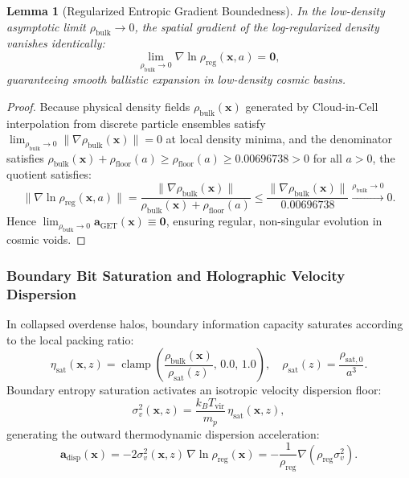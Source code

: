 \documentclass[11pt]{article}
\theoremstyle{plain}
\newtheorem{lemma}{Lemma}
\begin{document}
\begin{lemma}[Regularized Entropic Gradient Boundedness]
In the low-density asymptotic limit $\rho_{\mathrm{bulk}} \to 0$, the spatial gradient of the log-regularized density vanishes identically:
\begin{equation}
\lim_{\rho_{\mathrm{bulk}} \to 0} \nabla \ln \rho_{\mathrm{reg}}(\mathbf{x}, a) = \mathbf{0},
\end{equation}
guaranteeing smooth ballistic expansion in low-density cosmic basins.
\end{lemma}

\begin{proof}
Because physical density fields $\rho_{\mathrm{bulk}}(\mathbf{x})$ generated by Cloud-in-Cell interpolation from discrete particle ensembles satisfy $\lim_{\rho_{\mathrm{bulk}} \to 0} \|\nabla \rho_{\mathrm{bulk}}(\mathbf{x})\| = 0$ at local density minima, and the denominator satisfies $\rho_{\mathrm{bulk}}(\mathbf{x}) + \rho_{\mathrm{floor}}(a) \ge \rho_{\mathrm{floor}}(a) \ge 0.00696738 > 0$ for all $a > 0$, the quotient satisfies:
\begin{equation}
\|\nabla \ln \rho_{\mathrm{reg}}(\mathbf{x}, a)\| = \frac{\|\nabla \rho_{\mathrm{bulk}}(\mathbf{x})\|}{\rho_{\mathrm{bulk}}(\mathbf{x}) + \rho_{\mathrm{floor}}(a)} \le \frac{\|\nabla \rho_{\mathrm{bulk}}(\mathbf{x})\|}{0.00696738} \xrightarrow{\rho_{\mathrm{bulk}} \to 0} 0.
\end{equation}
Hence $\lim_{\rho_{\mathrm{bulk}} \to 0} \mathbf{a}_{\mathrm{GET}}(\mathbf{x}) \equiv \mathbf{0}$, ensuring regular, non-singular evolution in cosmic voids.
\end{proof}

\subsubsection{Boundary Bit Saturation and Holographic Velocity Dispersion}
In collapsed overdense halos, boundary information capacity saturates according to the local packing ratio:
\begin{equation}
\eta_{\mathrm{sat}}(\mathbf{x}, z) = \operatorname{clamp}\left( \frac{\rho_{\mathrm{bulk}}(\mathbf{x})}{\rho_{\mathrm{sat}}(z)}, \, 0.0, \, 1.0 \right), \quad \rho_{\mathrm{sat}}(z) = \frac{\rho_{\mathrm{sat}, 0}}{a^3}.
\end{equation}
Boundary entropy saturation activates an isotropic velocity dispersion floor:
\begin{equation}
\label{eq:sigma_v_def}
\sigma_v^2(\mathbf{x}, z) = \frac{k_B T_{\mathrm{vir}}}{m_p} \, \eta_{\mathrm{sat}}(\mathbf{x}, z),
\end{equation}
generating the outward thermodynamic dispersion acceleration:
\begin{equation}
\label{eq:a_disp_formal}
\mathbf{a}_{\mathrm{disp}}(\mathbf{x}) = - 2 \sigma_v^2(\mathbf{x}, z) \, \nabla \ln \rho_{\mathrm{reg}}(\mathbf{x}) = -\frac{1}{\rho_{\mathrm{reg}}} \nabla\left( \rho_{\mathrm{reg}} \sigma_v^2 \right).
\end{equation}
\end{document}
